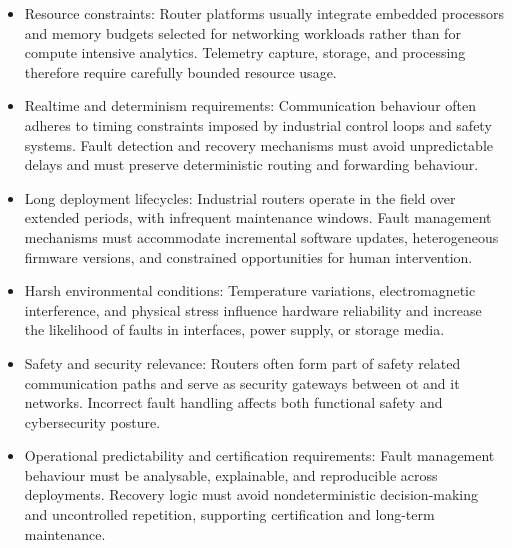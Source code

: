 \begin{itemize}
\item Resource constraints: Router platforms usually integrate embedded processors and memory budgets selected for networking workloads rather than for compute intensive analytics. Telemetry capture, storage, and processing therefore require carefully bounded resource usage.
\item Realtime and determinism requirements: Communication behaviour often adheres to timing constraints imposed by industrial control loops and safety systems. Fault detection and recovery mechanisms must avoid unpredictable delays and must preserve deterministic routing and forwarding behaviour.
\item Long deployment lifecycles: Industrial routers operate in the field over extended periods, with infrequent maintenance windows. Fault management mechanisms must accommodate incremental software updates, heterogeneous firmware versions, and constrained opportunities for human intervention.
\item Harsh environmental conditions: Temperature variations, electromagnetic interference, and physical stress influence hardware reliability and increase the likelihood of faults in interfaces, power supply, or storage media.
\item Safety and security relevance: Routers often form part of safety related communication paths and serve as security gateways between \gls{ot} and \gls{it} networks. Incorrect fault handling affects both functional safety and cybersecurity posture.
\item Operational predictability and certification requirements: Fault management behaviour must be analysable, explainable, and reproducible across deployments. Recovery logic must avoid nondeterministic decision-making and uncontrolled repetition, supporting certification and long-term maintenance.
\end{itemize}

